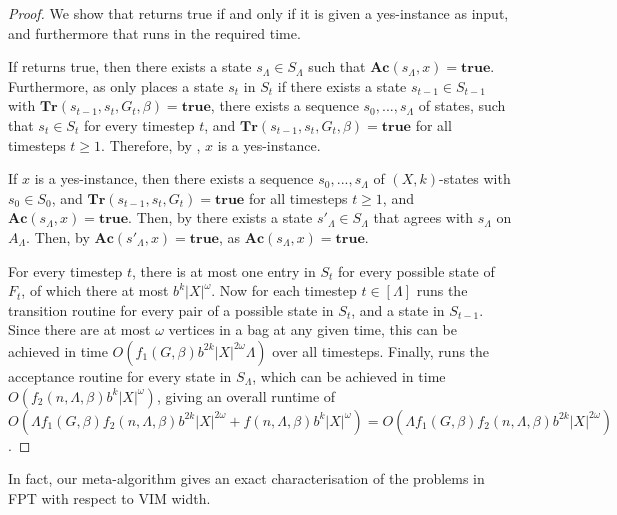 \documentclass[a4paper,UKenglish,cleveref, autoref, thm-restate]{lipics-v2021} %
\begin{document}
\begin{proof}
    We show that  returns true if and only if it is given a yes-instance as input, and furthermore that  runs in the required time.

    If  returns true, then there exists a state $s_\Lambda \in S_\Lambda$ such that $\textbf{Ac}(s_\Lambda, x) = \textbf{true}$. Furthermore, as  only places a state $s_t$ in $S_t$ if there exists a state $s_{t-1} \in S_{t-1}$ with $\textbf{Tr}(s_{t-1}, s_t, G_t,\beta)=\textbf{true}$, there exists a sequence $s_0, ..., s_\Lambda$ of states, such that $s_t \in S_t$ for every timestep $t$, and $\textbf{Tr}(s_{t-1}, s_t, G_t,\beta)=\textbf{true}$ for all timesteps $t \geq 1$. Therefore, by , $x$ is a yes-instance.

    If $x$ is a yes-instance, then there exists a sequence $s_0, ..., s_\Lambda$ of $(X,k)$-states with $s_0 \in S_0$, and $\textbf{Tr}(s_{t-1}, s_t, G_t)=\textbf{true}$ for all timesteps $t \geq 1$, and $\textbf{Ac}(s_\Lambda, x)=\textbf{true}$. Then, by  there exists a state $s'_\Lambda \in S_\Lambda$ that agrees with $s_\Lambda$ on $A_\Lambda$. Then, by  $\textbf{Ac}(s'_\Lambda, x)=\textbf{true}$, as $\textbf{Ac}(s_\Lambda, x)=\textbf{true}$.

    For every timestep $t$, there is at most one entry in $S_t$ for every possible state of $F_t$, of which there at most $b^k|X|^\omega$. Now for each timestep $t \in [\Lambda]$  runs the transition routine for every pair of a possible state in $S_t$, and a state in $S_{t-1}$. Since there are at most $\omega$ vertices in a bag at any given time, this can be achieved in time $O(f_1(G,\beta)b^{2k}|X|^{2\omega}\Lambda)$ over all timesteps. Finally,  runs the acceptance routine for every state in $S_\Lambda$, which can be achieved in time $O(f_2(n, \Lambda,\beta)b^k|X|^\omega)$, giving an overall runtime of $O(\Lambda f_1(G,\beta)f_2(n,\Lambda,\beta)b^{2k}|X|^{2\omega}+f(n, \Lambda,\beta)b^k|X|^\omega)=O(\Lambda f_1(G,\beta)f_2(n, \Lambda,\beta)b^{2k}|X|^{2\omega})$.
\end{proof}


In fact, our meta-algorithm gives an exact characterisation of the problems in FPT with respect to VIM width.
\end{document}

